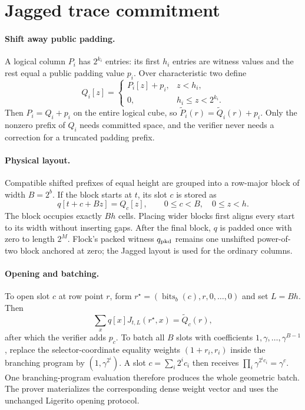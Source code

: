 \documentclass[11pt]{article}
\newcommand{\mle}[1]{\widetilde{#1}}
\newcommand{\bits}{\operatorname{bits}}
\begin{document}
\section{Jagged trace commitment}

\paragraph{Shift away public padding.} A logical column $P_i$ has $2^{k_i}$ entries: its first $h_i$ entries are witness values and the rest equal a public padding value $p_i$. Over characteristic two define
\[
Q_i[z]=\begin{cases}P_i[z]+p_i,&z<h_i,\\0,&h_i\leq z<2^{k_i}.
\end{cases}
\]
Then $P_i=Q_i+p_i$ on the entire logical cube, so $\mle P_i(r)=\mle Q_i(r)+p_i$. Only the nonzero prefix of $Q_i$ needs committed space, and the verifier never needs a correction for a truncated padding prefix.

\paragraph{Physical layout.} Compatible shifted prefixes of equal height are grouped into a row-major block of width $B=2^b$. If the block starts at $t$, its slot $c$ is stored as
\[
q[t+c+Bz]=Q_c[z],\qquad 0\leq c<B,\quad 0\leq z<h.
\]
The block occupies exactly $Bh$ cells. Placing wider blocks first aligns every start to its width without inserting gaps. After the final block, $q$ is padded once with zero to length $2^M$. Flock's packed witness $q_{\rm pkd}$ remains one unshifted power-of-two block anchored at zero; the Jagged layout is used for the ordinary columns.

\paragraph{Opening and batching.} To open slot $c$ at row point $r$, form $r^\star=(\bits_b(c),r,0,\ldots,0)$ and set $L=Bh$. Then
\[
\sum_xq[x]J_{t,L}(r^\star,x)=\mle Q_c(r),
\]
after which the verifier adds $p_c$. To batch all $B$ slots with coefficients $1,\gamma,\ldots,\gamma^{B-1}$, replace the selector-coordinate equality weights $(1+r_i,r_i)$ inside the branching program by $(1,\gamma^{2^i})$. A slot $c=\sum_i2^ic_i$ then receives $\prod_i\gamma^{2^ic_i}=\gamma^c$. One branching-program evaluation therefore produces the whole geometric batch. The prover materializes the corresponding dense weight vector and uses the unchanged Ligerito opening protocol.
\end{document}
